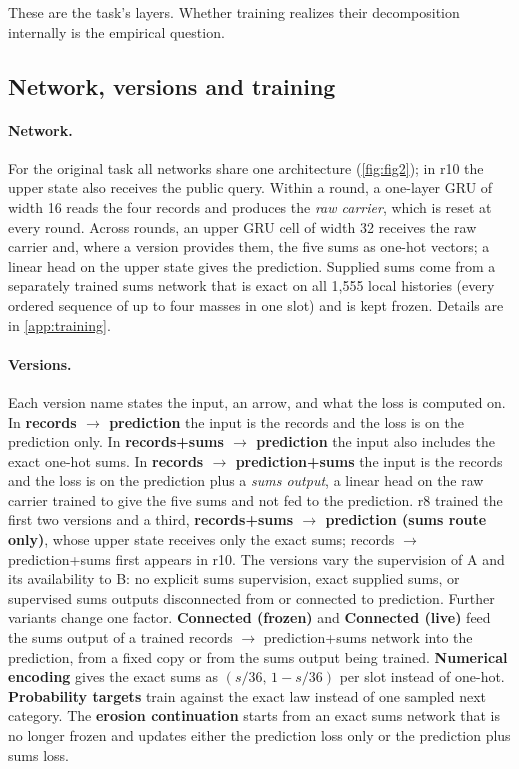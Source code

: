 These are the task's layers. Whether training realizes their decomposition
internally is the empirical question.

\subsection{Network, versions and training}\label{sec:versions}

\paragraph{Network.} For the original task all networks share one
architecture (\cref{fig:fig2}); in r10 the upper state also receives the
public query. Within a round, a one-layer GRU of width 16 reads the four
records and produces the \emph{raw carrier}, which is reset at every round.
Across rounds, an upper GRU cell of width 32 receives the raw carrier and,
where a version provides them, the five sums as one-hot vectors; a linear
head on the upper state gives the prediction. Supplied sums come from a
separately trained sums network that is exact on all 1,555 local histories
(every ordered sequence of up to four masses in one slot) and is kept
frozen. Details are in \cref{app:training}.

\paragraph{Versions.} Each version name states the input, an arrow, and what
the loss is computed on. In \textbf{records $\to$ prediction} the input is
the records and the loss is on the prediction only. In \textbf{records+sums
$\to$ prediction} the input also includes the exact one-hot sums. In
\textbf{records $\to$ prediction+sums} the input is the records and the loss
is on the prediction plus a \emph{sums output}, a linear head on the raw
carrier trained to give the five sums and not fed to the prediction.
r8 trained the first two versions and a third, \textbf{records+sums $\to$
prediction (sums route only)}, whose upper state receives only the exact
sums; records $\to$ prediction+sums first appears in r10. The versions vary the supervision of A and
its availability to B: no explicit sums supervision, exact supplied sums, or
supervised sums outputs disconnected from or connected to prediction.
Further variants change one factor. \textbf{Connected (frozen)} and \textbf{Connected (live)}
feed the sums output of a trained records $\to$ prediction+sums network into
the prediction, from a fixed copy or from the sums output being trained.
\textbf{Numerical encoding} gives the exact sums as $(s/36,\,1-s/36)$ per
slot instead of one-hot. \textbf{Probability targets} train against the
exact law instead of one sampled next category. The \textbf{erosion
continuation} starts from an exact sums network that is no longer frozen and
updates either the prediction loss only or the prediction plus sums loss.

